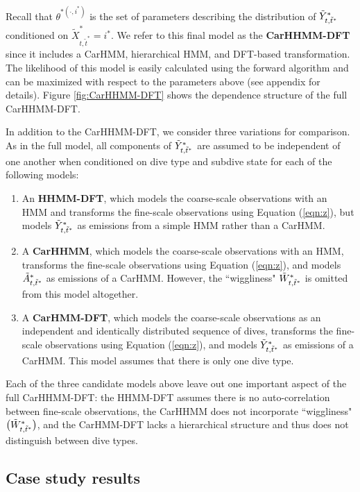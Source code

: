 %
Recall that $\theta^{*(\cdot,i^*)}$ is the set of parameters describing the distribution of $\tilde{Y}^*_{t,\tilde t^*}$ conditioned on $\tilde X^*_{t,\tilde t^*} = i^*$. 
%
We refer to this final model as the \textbf{CarHHMM-DFT} since it includes a CarHMM, hierarchical HMM, and DFT-based transformation. The likelihood of this model is easily calculated using the forward algorithm and can be maximized with respect to the parameters above (see appendix for details). Figure \ref{fig:CarHHMM-DFT} shows the dependence structure of the full CarHHMM-DFT.

In addition to the CarHHMM-DFT, we consider three variations for comparison. As in the full model, all components of $\tilde{Y}^*_{t,\tilde t^*}$ are assumed to be independent of one another when conditioned on dive type and subdive state for each of the following models:
\begin{enumerate}
    \item An \textbf{HHMM-DFT}, which models the coarse-scale observations with an HMM and transforms the fine-scale observations using Equation (\ref{eqn:z}), but models $\tilde{Y}^*_{t,\tilde t^*}$ as emissions from a simple HMM rather than a CarHMM.
    \item A \textbf{CarHHMM}, which models the coarse-scale observations with an HMM, transforms the fine-scale observations using Equation (\ref{eqn:z}), and models $\tilde{A}^*_{t,\tilde t^*}$ as emissions of a CarHMM. However, the ``wiggliness"  $\tilde{W}^*_{t,\tilde t^*}$ is omitted from this model altogether.
    \item A \textbf{CarHMM-DFT}, which models the coarse-scale observations as an independent and identically distributed sequence of dives, transforms the fine-scale observations using Equation (\ref{eqn:z}), and models $\tilde{Y}^*_{t,\tilde t^*}$ as emissions of a CarHMM. This model assumes that there is only one dive type.
\end{enumerate}
%
Each of the three candidate models above leave out one important aspect of the full CarHHMM-DFT: the HHMM-DFT assumes there is no auto-correlation between fine-scale observations, the CarHHMM does not incorporate ``wiggliness" $\big(\tilde{W}^*_{t,\tilde t^*}\big)$, and the CarHMM-DFT lacks a hierarchical structure and thus does not distinguish between dive types.

\subsection{Case study results}

